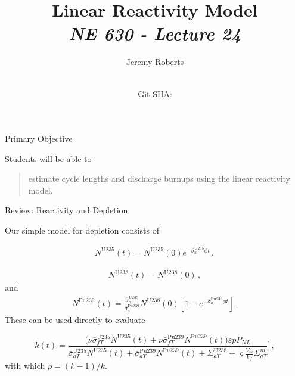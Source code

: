 \documentclass[aspectratio=1610]{beamer}
\title{Linear Reactivity Model\\
       {\small\it NE 630 - Lecture 24}}
\date{ \\ {\footnotesize Git SHA: }}
\author{Jeremy Roberts}
\begin{document}
\begin{frame}
\titlepage
\end{frame}
 
 
\begin{frame}{Primary Objective}

Students will be able to 

\vfill

\begin{quote}
\textcolor{wcprimary}{estimate cycle lengths and discharge burnups using the linear reactivity model.
}
\end{quote}

\vfill 

\end{frame}

\begin{frame}[fragile]{Review: Reactivity and Depletion}

Our simple model for depletion consists of

\begin{equation*}
\tag{10.27 $\rightarrow$ 10.31}
\begin{split}
N^{\text{U}235}(t) = N^{\text{U}235}(0) e^{-\bar{\sigma}^{\text{U}235}_a \phi t} \, ,
\end{split}
\end{equation*}

\begin{equation*}
\tag{10.27 $\rightarrow$  10.34}
\begin{split}
N^{\text{U}238}(t) = N^{\text{U}238}(0) \, ,
\end{split}
\end{equation*}
and
\begin{equation*}
\tag{10.30 $\rightarrow$  10.37}
\begin{split}
N^{\text{Pu}239}(t) 
  = \frac{\bar{\sigma}^{\text{U}238}_{\gamma}}{\bar{\sigma}^{\text{Pu}239}_a} 
    N^{\text{U}238}(0) \left [1 - e^{-\bar{\sigma}^{\text{Pu}239}_a \phi t} \right ] \, .
\end{split}    
\end{equation*}
These can be used directly to evaluate 

 \begin{equation*}
  \tag{10.39}
  k(t) = \frac{\big(\nu\bar{\sigma}^{\text{U}235}_{fT} N^{\text{U}235}(t) + \nu\bar{\sigma}^{\text{Pu}239}_{fT} N^{\text{Pu}239}(t)\big)\varepsilon p P_{NL}}
  {\bar{\sigma}^{\text{U}235}_{aT} N^{\text{U}235}(t) + \bar{\sigma}^{\text{Pu}239}_{aT} N^{\text{Pu}239}(t) + \Sigma_{aT}^{\text{U}238} + \varsigma \frac{V_m }{V_f}\Sigma_{aT}^m} ]\, ,
\end{equation*}
with which $\rho = (k-1)/k$.

\end{frame}
\end{document}
